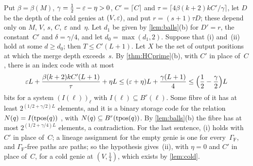 \begin{outline}
Put $\beta=\beta(M)$, $\gamma=\frac12-\varepsilon-\eta>0$, $C'=\lceil C\rceil$ and $\tau=\lceil4\beta(k+2)kC'/\gamma\rceil$, let
$D$ be the depth of the cold genies at $(V,\varepsilon)$, and put $r=(s+1)\tau D$; these depend only on $M$, $V$, $s$, $C$,
$\varepsilon$ and~$\eta$. Let $d_1$ be given by \cref{lem:balls}(b) for $D'=r$, the constant~$C'$ and $\delta=\gamma/4$, and let
$d_0=\max(d_1,2)$. Suppose that (i) and~(ii) hold at some $d\ge d_0$; then $T\le C'(L+1)$. Let $X$ be the set of output
positions at which the merge depth exceeds~$s$. By \cref{thm:HCprime}(b), with $C'$ in place of~$C$, there is an index
code with at most
\[
  \varepsilon L+\frac{\beta(k+2)kC'(L+1)}{\tau}+\eta L\le(\varepsilon+\eta)L+\frac{\gamma(L+1)}4\le\Bigl(\frac12-\frac\gamma2\Bigr)L
\]
bits for a system $(I(\ell))_\ell$ with $I(\ell)\subseteq B^r(\ell)$. Some fibre of it has at least
$2^{(1/2+\gamma/2)L}$ elements, and it is a binary storage code for the relation $N(q)=I(\operatorname{tpos}(q))$
\cite[Remark~4.9(b)]{FourthPaper2026}, with $N(q)\subseteq B^r(\operatorname{tpos}(q))$. By \cref{lem:balls}(b) the fibre has at most
$2^{(1/2+\gamma/4)L}$ elements, a contradiction. For the last sentence, (i) holds with $C'$ in place of~$C$; a lineage
assignment for the empty genie is one for every~$\Gamma_{\mathrm F}$, and $\Gamma_{\mathrm F}$-free paths are paths; so
the hypothesis gives~(ii), with $\eta=0$ and $C'$ in place of~$C$, for a cold genie at $(V,\frac14)$, which exists by
\cref{lem:cold}.


\end{outline}
